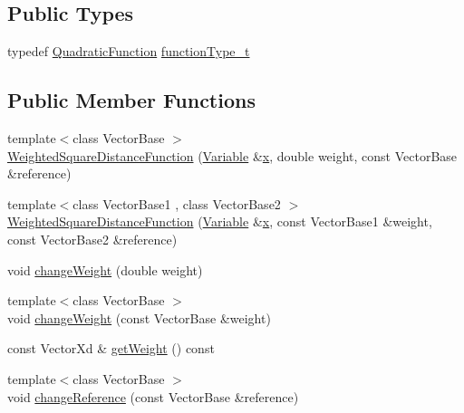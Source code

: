 \subsection*{Public Types}
\begin{DoxyCompactItemize}
\item 
typedef \hyperlink{classocra_1_1QuadraticFunction}{Quadratic\+Function} \hyperlink{classocra_1_1WeightedSquareDistanceFunction_ab8fcee2e8ec81e8790f3d00b1d541d9a}{function\+Type\+\_\+t}
\end{DoxyCompactItemize}
\subsection*{Public Member Functions}
\begin{DoxyCompactItemize}
\item 
{\footnotesize template$<$class Vector\+Base $>$ }\\\hyperlink{classocra_1_1WeightedSquareDistanceFunction_a25942322441c7bac8adb24d8f1d27905}{Weighted\+Square\+Distance\+Function} (\hyperlink{classocra_1_1Variable}{Variable} \&\hyperlink{classocra_1_1Function_a28825886d1f149c87b112ec2ec1dd486}{x}, double weight, const Vector\+Base \&reference)
\item 
{\footnotesize template$<$class Vector\+Base1 , class Vector\+Base2 $>$ }\\\hyperlink{classocra_1_1WeightedSquareDistanceFunction_a1aca7da80ddc408d8194d32712418b89}{Weighted\+Square\+Distance\+Function} (\hyperlink{classocra_1_1Variable}{Variable} \&\hyperlink{classocra_1_1Function_a28825886d1f149c87b112ec2ec1dd486}{x}, const Vector\+Base1 \&weight, const Vector\+Base2 \&reference)
\item 
void \hyperlink{classocra_1_1WeightedSquareDistanceFunction_aa46e440abf19590ebdc4b72b97c9901d}{change\+Weight} (double weight)
\item 
{\footnotesize template$<$class Vector\+Base $>$ }\\void \hyperlink{classocra_1_1WeightedSquareDistanceFunction_a8001ac136e0c486571e5523d01e6de38}{change\+Weight} (const Vector\+Base \&weight)
\item 
const Vector\+Xd \& \hyperlink{classocra_1_1WeightedSquareDistanceFunction_a830f93e5be8ede8c5cdc18396e89ead3}{get\+Weight} () const
\item 
{\footnotesize template$<$class Vector\+Base $>$ }\\void \hyperlink{classocra_1_1WeightedSquareDistanceFunction_a6a81acd002eb8f7576b0c9ee99e1bc46}{change\+Reference} (const Vector\+Base \&reference)
\end{DoxyCompactItemize}
